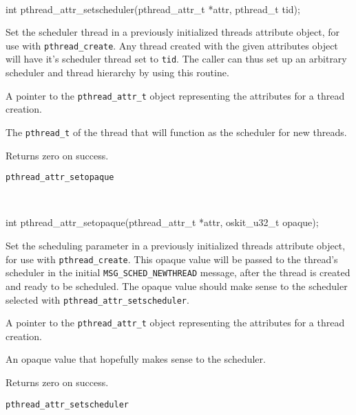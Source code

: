 \begin{apisyn}
	\\

	\funcproto int pthread_attr_setscheduler(pthread_attr_t *attr,
			pthread_t tid);
\end{apisyn}
\begin{apidesc}
	Set the scheduler thread in a previously initialized threads
	attribute object, for use with {\tt pthread_create}. Any thread
	created with the given attributes object will have it's scheduler
	thread set to \texttt{tid}. The caller can thus set up an arbitrary
	scheduler and thread hierarchy by using this routine. 
\end{apidesc}
\begin{apiparm}
	\item[attr]
		A pointer to the {\tt pthread_attr_t} object
		representing the attributes for a thread creation.
	\item[tid]
		The \texttt{pthread_t} of the thread that will function as
		the scheduler for new threads.
\end{apiparm}
\begin{apiret}
	Returns zero on success.
\end{apiret}
\begin{apirel}
	{\tt pthread_attr_setopaque}
\end{apirel}


\begin{apisyn}
	\\

	\funcproto int pthread_attr_setopaque(pthread_attr_t *attr,
			oskit_u32_t opaque);
\end{apisyn}
\begin{apidesc}
	Set the scheduling parameter in a previously initialized threads
	attribute object, for use with {\tt pthread_create}. This opaque
	value will be passed to the thread's scheduler in the initial
	\texttt{MSG_SCHED_NEWTHREAD} message, after the thread is created
	and ready to be scheduled. The opaque value should make sense to
	the scheduler selected with \texttt{pthread_attr_setscheduler}.
\end{apidesc}
\begin{apiparm}
	\item[attr]
		A pointer to the {\tt pthread_attr_t} object
		representing the attributes for a thread creation.
	\item[opaque]
		An opaque value that hopefully makes sense to the scheduler. 
\end{apiparm}
\begin{apiret}
	Returns zero on success.
\end{apiret}
\begin{apirel}
	{\tt pthread_attr_setscheduler}
\end{apirel}

